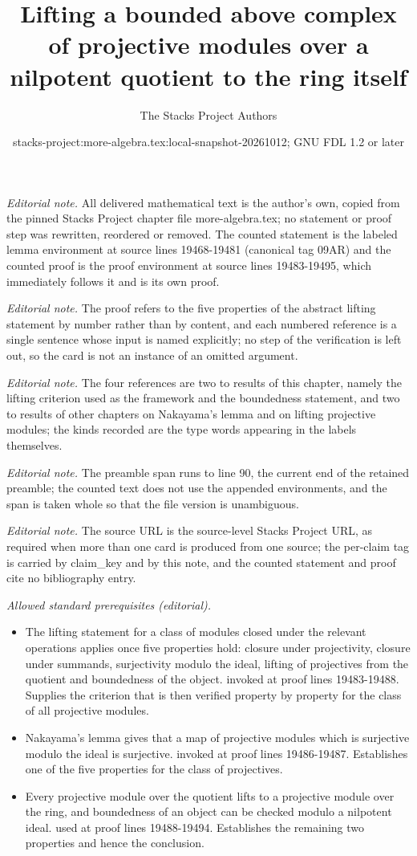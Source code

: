 \documentclass[10pt,a4paper]{amsart}
\title{Lifting a bounded above complex of projective modules over a nilpotent quotient to the ring itself}
\author{The Stacks Project Authors}
\date{stacks-project:more-algebra.tex:local-snapshot-20261012; GNU FDL 1.2 or later}
\theoremstyle{plain}
\theoremstyle{definition}
\theoremstyle{remark}
\numberwithin{equation}{subsection}
\begin{document}
\maketitle
\setcounter{subsection}{1}
\noindent\textit{Editorial note.} All delivered mathematical text is the author's own, copied from the pinned Stacks Project chapter file more-algebra.tex; no statement or proof step was rewritten, reordered or removed. The counted statement is the labeled lemma environment at source lines 19468-19481 (canonical tag 09AR) and the counted proof is the proof environment at source lines 19483-19495, which immediately follows it and is its own proof.\par\medskip
\noindent\textit{Editorial note.} The proof refers to the five properties of the abstract lifting statement by number rather than by content, and each numbered reference is a single sentence whose input is named explicitly; no step of the verification is left out, so the card is not an instance of an omitted argument.\par\medskip
\noindent\textit{Editorial note.} The four references are two to results of this chapter, namely the lifting criterion used as the framework and the boundedness statement, and two to results of other chapters on Nakayama's lemma and on lifting projective modules; the kinds recorded are the type words appearing in the labels themselves.\par\medskip
\noindent\textit{Editorial note.} The preamble span runs to line 90, the current end of the retained preamble; the counted text does not use the appended environments, and the span is taken whole so that the file version is unambiguous.\par\medskip
\noindent\textit{Editorial note.} The source URL is the source-level Stacks Project URL, as required when more than one card is produced from one source; the per-claim tag is carried by claim\_key and by this note, and the counted statement and proof cite no bibliography entry.\par\medskip
\noindent\textit{Allowed standard prerequisites (editorial).}\begin{itemize}
\item The lifting statement for a class of modules closed under the relevant operations applies once five properties hold: closure under projectivity, closure under summands, surjectivity modulo the ideal, lifting of projectives from the quotient and boundedness of the object. invoked at proof lines 19483-19488. Supplies the criterion that is then verified property by property for the class of all projective modules.
\item Nakayama's lemma gives that a map of projective modules which is surjective modulo the ideal is surjective. invoked at proof lines 19486-19487. Establishes one of the five properties for the class of projectives.
\item Every projective module over the quotient lifts to a projective module over the ring, and boundedness of an object can be checked modulo a nilpotent ideal. used at proof lines 19488-19494. Establishes the remaining two properties and hence the conclusion.
\end{itemize}\medskip
\end{document}
